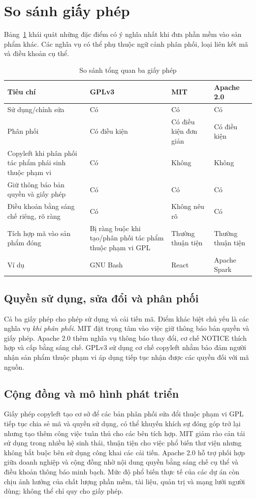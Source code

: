 \documentclass[12pt,a4paper]{article}
\begin{document}
\section{So sánh giấy phép}
Bảng~\ref{tab:license} khái quát những đặc điểm có ý nghĩa nhất khi đưa phần mềm vào sản phẩm khác. Các nghĩa vụ có thể phụ thuộc ngữ cảnh phân phối, loại liên kết mã và điều khoản cụ thể.
\begin{table}[htbp]
\centering\small
\caption{So sánh tổng quan ba giấy phép}\label{tab:license}
\begin{tabularx}{\textwidth}{>{\raggedright\arraybackslash}p{3cm}XXX}
\toprule
Tiêu chí & GPLv3 & MIT & Apache 2.0 \\
\midrule
Sử dụng/chỉnh sửa & Có & Có & Có\\
Phân phối & Có điều kiện & Có điều kiện đơn giản & Có điều kiện\\
Copyleft khi phân phối tác phẩm phái sinh thuộc phạm vi & Có & Không & Không\\
Giữ thông báo bản quyền và giấy phép & Có & Có & Có\\
Điều khoản bằng sáng chế riêng, rõ ràng & Có & Không nêu rõ & Có\\
Tích hợp mã vào sản phẩm đóng & Bị ràng buộc khi tạo/phân phối tác phẩm thuộc phạm vi GPL & Thường thuận tiện & Thường thuận tiện\\
Ví dụ & GNU Bash & React & Apache Spark\\
\bottomrule
\end{tabularx}
\end{table}
\subsection{Quyền sử dụng, sửa đổi và phân phối}
Cả ba giấy phép cho phép sử dụng và cải tiến mã. Điểm khác biệt chủ yếu là các nghĩa vụ \emph{khi phân phối}. MIT đặt trọng tâm vào việc giữ thông báo bản quyền và giấy phép. Apache 2.0 thêm nghĩa vụ thông báo thay đổi, cơ chế NOTICE thích hợp và cấp bằng sáng chế. GPLv3 sử dụng cơ chế copyleft nhằm bảo đảm người nhận sản phẩm thuộc phạm vi áp dụng tiếp tục nhận được các quyền đối với mã nguồn.
\subsection{Cộng đồng và mô hình phát triển}
Giấy phép copyleft tạo cơ sở để các bản phân phối sửa đổi thuộc phạm vi GPL tiếp tục chia sẻ mã và quyền sử dụng, có thể khuyến khích sự đóng góp trở lại nhưng tạo thêm công việc tuân thủ cho các bên tích hợp. MIT giảm rào cản tái sử dụng trong nhiều hệ sinh thái, thuận tiện cho việc phổ biến thư viện nhưng không bắt buộc bên sử dụng công khai các cải tiến. Apache 2.0 hỗ trợ phối hợp giữa doanh nghiệp và cộng đồng nhờ nội dung quyền bằng sáng chế cụ thể và điều khoản thông báo minh bạch. Mức độ phổ biến thực tế của các dự án còn chịu ảnh hưởng của chất lượng phần mềm, tài liệu, quản trị và mạng lưới người dùng; không thể chỉ quy cho giấy phép.
\end{document}
